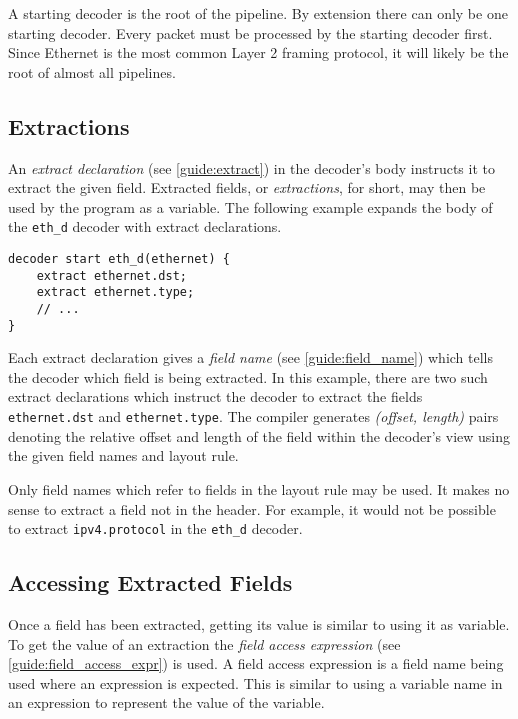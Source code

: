 A starting decoder is the root of the pipeline.
By extension there can only be one starting decoder.
Every packet must be processed by the starting decoder first.
Since Ethernet is the most common Layer 2 framing protocol, it will
likely be the root of almost all pipelines.

\subsection{Extractions} \label{tut:decoder_extract}

An \textit{extract declaration} (see \ref{guide:extract}) in the decoder's body
instructs it to extract the given field. Extracted fields, or \emph{extractions},
for short, may then be used by the program as a variable.
The following example expands the body of the \texttt{eth\_d} decoder 
with extract declarations.

\begin{lstlisting}
decoder start eth_d(ethernet) {
	extract ethernet.dst;
	extract ethernet.type;
	// ...
}
\end{lstlisting}

Each extract declaration gives a \emph{field name} (see \ref{guide:field_name}) 
which tells the decoder which field is being extracted. 
In this example, there are
two such extract declarations which instruct the decoder to extract
the fields \texttt{ethernet.dst} and \texttt{ethernet.type}.
The compiler generates \textit{(offset, length)} pairs 
denoting the relative offset and length of the field within the decoder's view using the given field names and layout rule. 

Only field names which refer to fields in the layout rule may be used. It makes no sense to extract a field not in the header. 
For example, it would not be possible to extract \texttt{ipv4.protocol} in the \texttt{eth\_d} decoder. 

\subsection{Accessing Extracted Fields} \label{tut:decoder_access}

Once a field has been extracted, getting its value is similar to using
it as variable.
To get the value of an extraction
the \textit{field access expression} (see \ref{guide:field_access_expr}) is used.
A field access expression is a field name being used where
an expression is expected. This is similar to using a variable name
in an expression to represent the value of the variable.

